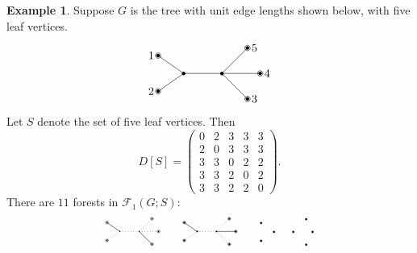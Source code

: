 \documentclass[12pt]{amsart}
\theoremstyle{definition}
\newtheorem{eg}[thm]{Example}
\newcommand{\trees}{\mathcal{F}_1}
\begin{document}
\begin{eg}
Suppose $G$ is the tree with unit edge lengths shown below, with five leaf vertices.
\[
\begin{tikzpicture}[scale=0.8]
	\coordinate (1) at (-2,0.7);
	\coordinate (2) at (-2,-0.7);
	\coordinate (3) at (1.5,-1);
	\coordinate (4) at (2,0);
	\coordinate (5) at (1.5,1);
	\coordinate (A) at (-1,0);
	\coordinate (B) at (0.5,0);
	
	\foreach \c in {1,2,3,4,5,A,B} {
		\fill (\c) circle (2pt);
	}
	\foreach \c in {1,2,3,4,5} {
		\draw (\c) circle (3pt);
	}

	\draw (A) -- (1);
	\draw (A) -- (2);
	\draw (B) -- (3);
	\draw (B) -- (4);
	\draw (B) -- (5);
	\draw (A) -- (B);
	
	\foreach \c/\d in {1/left,2/left,3/right,4/right,5/right} {
		\node[\d=0.2] at (\c) {$\c$};
	}
\end{tikzpicture}
\]
Let $S$ denote the set of five leaf vertices. Then
$$
D[S] = \begin{pmatrix}
0 & 2 & 3 & 3 & 3 \\
2 & 0 & 3 & 3 & 3 \\
3 & 3 & 0 & 2 & 2 \\
3 & 3 & 2 & 0 & 2 \\
3 & 3 & 2 & 2 & 0
\end{pmatrix}.
$$
There are $11$ forests in $\trees(G;S)$:
\[
\begin{tikzpicture}[scale=0.4]
	\coordinate (1) at (-2,0.7);
	\coordinate (2) at (-2,-0.7);
	\coordinate (3) at (1.5,-1);
	\coordinate (4) at (2,0);
	\coordinate (5) at (1.5,1);
	\coordinate (A) at (-1,0);
	\coordinate (B) at (0.5,0);
	
	\foreach \c in {1,2,3,4,5,A,B} {
		\fill (\c) circle (1.5pt);
	}
	\foreach \c in {1,2,3,4,5} {
		\draw (\c) circle (3pt);
	}

	\draw (A) -- (1);
	\draw[dotted] (A) -- (2);
	\draw (B) -- (3);
	\draw[dotted] (B) -- (4);
	\draw[dotted] (B) -- (5);
	\draw[dotted] (A) -- (B);
\end{tikzpicture}
\qquad
\begin{tikzpicture}[scale=0.4]
	\coordinate (1) at (-2,0.7);
	\coordinate (2) at (-2,-0.7);
	\coordinate (3) at (1.5,-1);
	\coordinate (4) at (2,0);
	\coordinate (5) at (1.5,1);
	\coordinate (A) at (-1,0);
	\coordinate (B) at (0.5,0);
	
	\foreach \c in {1,2,3,4,5,A,B} {
		\fill (\c) circle (1.8pt);
	}
	\foreach \c in {1,2,3,4,5} {
		\draw (\c) circle (3pt);
	}

	\draw (A) -- (1);
	\draw[dotted] (A) -- (2);
	\draw[dotted] (B) -- (3);
	\draw (B) -- (4);
	\draw[dotted] (B) -- (5);
	\draw[dotted] (A) -- (B);
\end{tikzpicture}
\qquad
\begin{tikzpicture}[scale=0.4]
	\filldraw[black] (-2,0.7) coordinate (1) circle (2pt);
	\filldraw[black] (-2,-0.7) coordinate (2) circle (2pt);
	\filldraw[black] (1.5,-1) coordinate (3) circle (2pt);
	\filldraw[black] (2,0) coordinate (4) circle (2pt);
	\filldraw[black] (1.5,1) coordinate (5) circle (2pt);
	\filldraw[black] (-1,0) coordinate (A) circle (2pt);
	\filldraw[black] (0.5,0) coordinate (B) circle (2pt);


\end{tikzpicture}\]
\end{eg}
\end{document}
